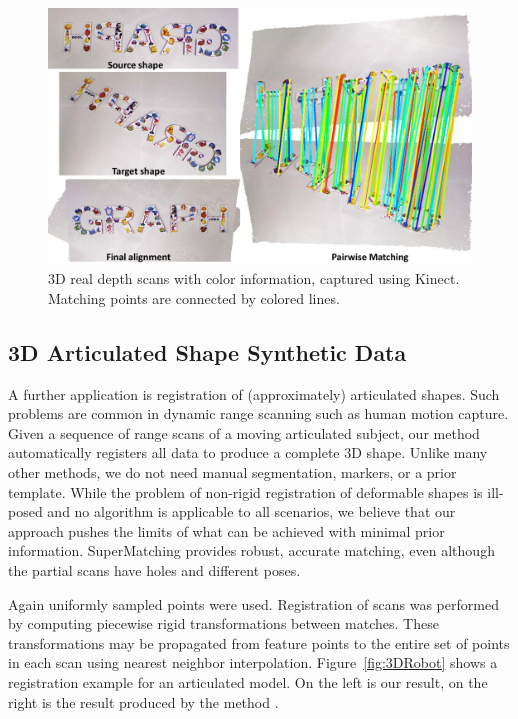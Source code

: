 \begin{figure}[h]
\centering
  \includegraphics[width=1.05\linewidth]{figures/kinect.pdf}
  \caption{3D real depth scans with color information, captured using Kinect.
    Matching points are connected by colored lines.}
\label{fig:3DReal}
\end{figure}

\subsection{3D Articulated Shape Synthetic Data}
\label{subsec:3darticulated}

A further application is registration of (approximately) articulated shapes. Such problems are common in dynamic range scanning such as human motion capture.
Given a sequence of range scans of a moving articulated subject, our method automatically registers all data to produce a complete 3D shape.
Unlike many other methods, we do not need  manual segmentation,  markers, or a prior template.
While the problem of non-rigid registration of deformable shapes is ill-posed and no algorithm is applicable to all scenarios,
we believe that our approach pushes the limits of what can be achieved with minimal prior information. SuperMatching provides robust, accurate matching,
even although the partial scans have holes and different poses.

Again uniformly sampled points were used. Registration of scans was performed by computing piecewise rigid transformations between matches.
These transformations may be propagated from feature points to the entire set of points in each scan using nearest neighbor interpolation.
Figure~\ref{fig:3DRobot} shows a registration example for an articulated model.
On the left is our result, on the right is the result produced by the method \cite{Chang09}.

